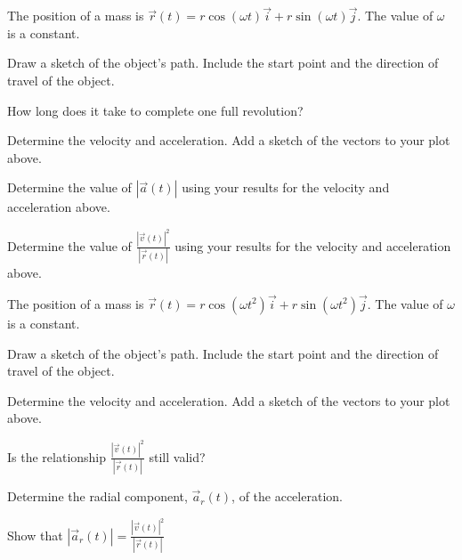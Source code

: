 \begin{problem}
%

\item The position of a mass is
  $\vec{r}(t)=r\cos(\omega t)\vec{i}+r\sin(\omega t)\vec{j}$. The
  value of $\omega$ is a constant.
  \begin{subproblem}
  \item Draw a sketch of the object's path. Include the start point
    and the direction of travel of the object.
    \vfill
  \item How long does it take to complete one full revolution?
    \vspace{3em}
  \item Determine the velocity and acceleration. Add a sketch of the
    vectors to your plot above.
    \vfill
    \clearpage
  \item Determine the value of $|\vec{a}(t)|$ using your results for
    the velocity and acceleration above.  
    \vfill
  \item Determine the value of $\frac{|\vec{v}(t)|^2}{|\vec{r}(t)|}$
    using your results for the velocity and acceleration above.
    \vfill
  \end{subproblem}

\end{problem}

\begin{problem}
\item The position of a mass is
  $\vec{r}(t)=r\cos(\omega t^2)\vec{i}+r\sin(\omega t^2)\vec{j}$. The
  value of $\omega$ is a constant.
  \begin{subproblem}
  \item Draw a sketch of the object's path. Include the start point
    and the direction of travel of the object.
    \vfill
  \item Determine the velocity and acceleration. Add a sketch of the
    vectors to your plot above.
    \vfill
    \clearpage
  \item Is the relationship $\frac{|\vec{v}(t)|^2}{|\vec{r}(t)|}$
    still valid?
    \vfill
  \item Determine the radial component, $\vec{a}_r(t)$, of the
    acceleration.
    \vfill
  \item Show that $|\vec{a}_r(t)| = \frac{|\vec{v}(t)|^2}{|\vec{r}(t)|}$
    \vfill
  \end{subproblem}
\end{problem}

